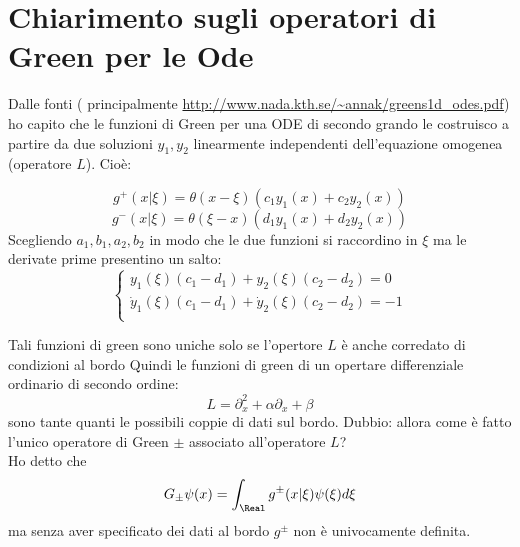\documentclass[Cascione]{subfiles}
\begin{document}
\section{Chiarimento sugli operatori di Green per le Ode}
Dalle fonti ( principalmente \url{http://www.nada.kth.se/~annak/greens1d_odes.pdf}) ho capito che le funzioni di Green per una ODE di secondo grando le costruisco a partire da due soluzioni $y_1, y_2$ linearmente independenti dell'equazione omogenea (operatore $L$).
Cioè:

\begin{displaymath}
	g^+ ( x \vert \xi) = \theta( x-\xi)  \left( c_1 y_1(x) + c_2 y_2(x)\right)
\end{displaymath}
\begin{displaymath}
	g^- ( x \vert \xi) = \theta( \xi-x)  \left( d_1 y_1(x) +d_2  y_2(x)\right)	
\end{displaymath}
Scegliendo $a_1,b_1,a_2,b_2$ in modo che le due funzioni si raccordino in $\xi$ ma le derivate prime presentino un salto:
			\begin{equation}
			\begin{cases}
						y_1(\xi) (c_1-d_1) + y_2(\xi) ( c_2 - d_2) = 0 \\
						\dot{y}_1(\xi) (c_1-d_1) + \dot{y}_2(\xi) ( c_2 - d_2) = -1 \\
            \end{cases}
			\end{equation}

Tali funzioni di green sono uniche solo se l'opertore $L$ è anche corredato di condizioni al bordo
\vspace{1mm}
Quindi le funzioni di green di un opertare differenziale ordinario di secondo ordine:
\begin{displaymath}
L = \partial_x^2 + \alpha \partial_x + \beta
\end{displaymath}
sono tante quanti le possibili coppie di dati sul bordo.
\vspace{2mm}
Dubbio: allora come è fatto l'unico operatore di Green $\pm$ associato all'operatore $L$?\\
Ho detto che 
\begin{displaymath}
	G_\pm \psi(x) = \int_\Real g^\pm(x \vert \xi) \psi(\xi) d\xi
\end{displaymath}
ma senza aver specificato dei dati al bordo $g^\pm$ non è univocamente definita.
\end{document}

